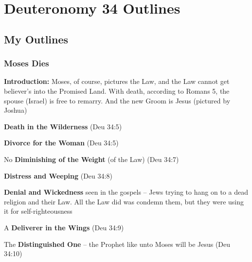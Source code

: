 \section{Deuteronomy 34 Outlines}

\subsection{My Outlines}

\subsubsection{Moses Dies}
\textbf{Introduction:} Moses, of course, pictures the Law, and the Law cannot get believer's into
the Promised Land.  With death, according to Romans 5, the spouse (Israel) is free to remarry. And the new
Groom is Jesus (pictured by Joshua)
\begin{compactenum}[I.][7]
    \item \textbf{Death in the Wilderness}  (Deu 34:5)
    \item \textbf{Divorce for the Woman}  (Deu 34:5)
    \item No \textbf{Diminishing of the Weight} (of the Law)  (Deu 34:7)
    \item \textbf{Distress and Weeping}  (Deu 34:8)
    \item \textbf{Denial and Wickedness} seen in the gospels -- Jews trying to hang on to a dead religion and their Law. All the Law did was condemn them, but they were using it for self-righteousness %
    \item A \textbf{Deliverer in the Wings}  (Deu 34:9)
    \item The \textbf{Distinguished One} -- the Prophet like unto Moses will be Jesus  (Deu 34:10)
\end{compactenum}

